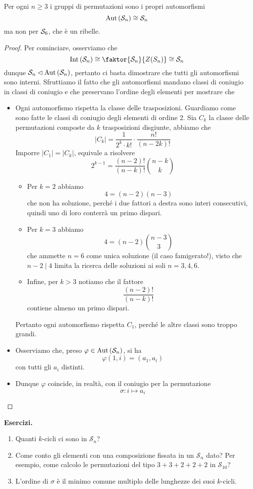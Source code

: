 \begin{multicols}{2}
\begin{theorem}
	Per ogni $ n \geq 3 $ i gruppi di permutazioni sono i propri automorfismi $$  \Aut{\S_n} \cong \S_n  $$ ma non per $ \S_6 $, che è un ribelle.
\end{theorem}
\begin{proof}
	Per cominciare, osserviamo che
	\[ \Int{\S_n} \cong \faktor{\S_n}{Z(S_n)} \cong \S_n \]
	dunque $ \S_n \lhd \Aut{\S_n} $, pertanto ci basta dimostrare che tutti gli automorfismi sono interni. Sfruttiamo il fatto che gli automorfismi mandano classi di coniugio in classi di coniugio e che preservano l'ordine degli elementi per mostrare che
	\begin{itemize}
		\item  Ogni automorfismo rispetta la classe delle trasposizioni. Guardiamo come sono fatte le classi di coniugio degli elementi di ordine 2. Sia $ C_k $ la classe delle permutazioni composte da $ k $ trasposizioni disgiunte, abbiamo che
		\[ |C_k|  = \frac{1}{2^k \cdot k!}\cdot \frac{n!}{(n-2k)!} \]
		Imporre $ |C_1| = |C_k| $, equivale a risolvere
		\[ 2^{k-1} = \frac{(n-2)!}{(n-k)!}{n-k \choose k } \]
		\begin{itemize}
			\item Per $ \boxed{k = 2} $ abbiamo
			\[ 4 = (n-2)(n-3) \]
			che non ha soluzione, perché i due fattori a destra sono interi consecutivi, quindi uno di loro conterrà un primo dispari.
			\item Per $ \boxed{k = 3} $ abbiamo
			\[ 4 = (n-2) {n-3 \choose 3} \]
			che ammette $ n = 6 $ come unica soluzione (il caso famigerato!), visto che $ n-2 \mid 4 $ limita la ricerca delle soluzioni ai soli $ n = 3, 4, 6 $.
			\item Infine, per $ \boxed{k > 3} $ notiamo che il fattore 
			\[ \frac{(n-2)!}{(n-k)!} \]
			contiene almeno un primo dispari.
		\end{itemize}
		Pertanto ogni automorfismo rispetta $ C_1 $, perché le altre classi sono troppo grandi. 
		\item Osserviamo che, preso $ \varphi \in \Aut{\S_n} $, si ha
		$$  \varphi(1, i) = (a_1, a_i)  $$
		con tutti gli $ a_i $ distinti.
		\item Dunque $ \varphi $ coincide, in realtà, con il coniugio per la permutazione
		$$  \sigma : i \mapsto a_i  $$
	\end{itemize}
\end{proof}
\textbf{Esercizi.}
\begin{enumerate}
	\item Quanti $ k $-cicli ci sono in $ \mathcal{S}_n $?
	\item Come conto gli elementi con una composizione fissata in un $ \mathcal{S}_n $ dato? Per esempio, come calcolo le permutazioni del tipo $ 3+3+2+2+2 $ in $ \mathcal{S}_{10} $?
	\item L'ordine di $ \sigma $ è il minimo comune multiplo delle lunghezze dei suoi $ k $-cicli.
	

\end{enumerate}
\end{multicols}
